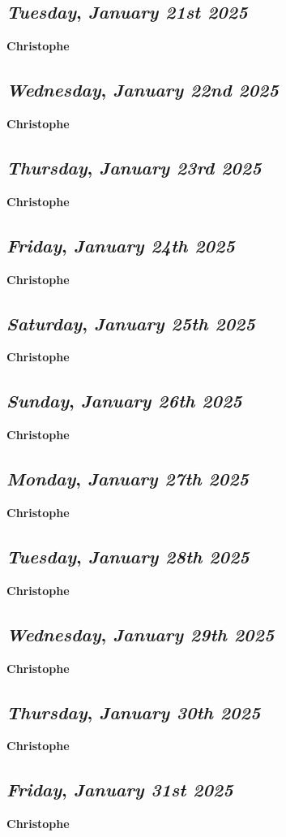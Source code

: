 \def\day{\textit{January 21st 2025}}
\def\weekday{\textit{Tuesday}}
\subsection*{\weekday, \day}
\textbf {Christophe}

\def\day{\textit{January 22nd 2025}}
\def\weekday{\textit{Wednesday}}
\subsection*{\weekday, \day}
\textbf {Christophe}

\def\day{\textit{January 23rd 2025}}
\def\weekday{\textit{Thursday}}
\subsection*{\weekday, \day}
\textbf {Christophe}

\def\day{\textit{January 24th 2025}}
\def\weekday{\textit{Friday}}
\subsection*{\weekday, \day}
\textbf {Christophe}

\def\day{\textit{January 25th 2025}}
\def\weekday{\textit{Saturday}}
\subsection*{\weekday, \day}
\textbf {Christophe}

\def\day{\textit{January 26th 2025}}
\def\weekday{\textit{Sunday}}
\subsection*{\weekday, \day}
\textbf {Christophe}

\def\day{\textit{January 27th 2025}}
\def\weekday{\textit{Monday}}
\subsection*{\weekday, \day}
\textbf {Christophe}

\def\day{\textit{January 28th 2025}}
\def\weekday{\textit{Tuesday}}
\subsection*{\weekday, \day}
\textbf {Christophe}

\def\day{\textit{January 29th 2025}}
\def\weekday{\textit{Wednesday}}
\subsection*{\weekday, \day}
\textbf {Christophe}

\def\day{\textit{January 30th 2025}}
\def\weekday{\textit{Thursday}}
\subsection*{\weekday, \day}
\textbf {Christophe}

\def\day{\textit{January 31st 2025}}
\def\weekday{\textit{Friday}}
\subsection*{\weekday, \day}
\textbf {Christophe}
